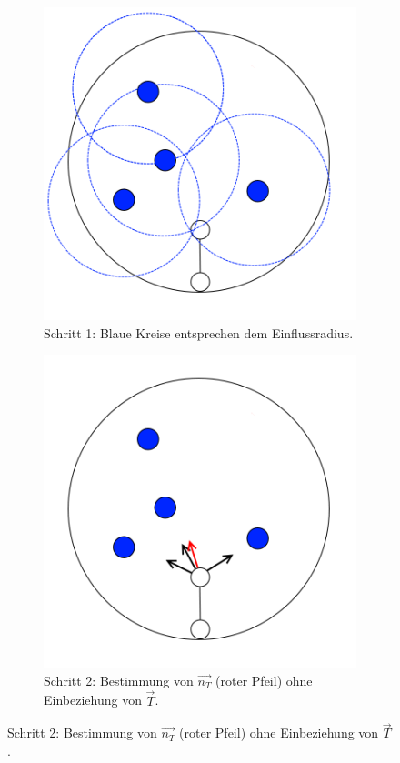 \begin{figure} [hbtp]
\begin{subfigure}[t]{.31\textwidth}
		\includegraphics[width=\linewidth]{images/SCA_Basic2.png}
		\caption{Schritt 1: Blaue Kreise entsprechen dem Einflussradius.}
		\label{subfig:SCA_Basic2}
	\end{subfigure}
	\hspace{.01\textwidth}
	\begin{subfigure}[t]{.31\textwidth}
		\centering
		\includegraphics[width=\linewidth]{images/SCA_Basic3.png}
		\caption{Schritt 2: Bestimmung von $\overrightarrow{n_T}$ (roter Pfeil) ohne Einbeziehung von $\overrightarrow{T}$.}
		\label{subfig:SCA_Basic3}
	\end{subfigure}


\end{figure}
